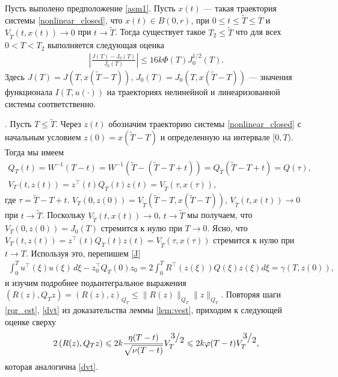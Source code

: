 \documentclass[../main.tex]{subfiles}
\begin{document}
\begin{theorem}\label{th:functional_error_estimate}
  Пусть выполено предположение \ref{asm1}. Пусть $x(t)$ --- такая траектория системы  \eqref{nonlinear_closed}, что $x(t)\in B(0,r)$, при $0\leqslant t  \leqslant \tilde{T} \leqslant \overline{T} $ и $V_{\tilde{T}}(t,x(t))\to 0$ при $t\to \tilde{T}$.  
  Тогда существует такое $T_2 \leqslant \tilde{T}$ что для всех  $0 < T < T_2 $ выполняется следующая оценка
   \begin{gather} \label{est}
	 \left| \frac{	J(T) - J_0(T)}{J_0(T)}\right| \leqslant 16k\Phi({T})J^{1/2}_0(T).
    \end{gather}
    Здесь $J(T)=J(T,x(\tilde{T}-T))$, $J_0(T)=J_0(T,x(\tilde{T}-T))$ --- значения функционала $I(T,u(\cdot))$ на траекториях нелинейной и линеаризованной системы соответственно.
\end{theorem}
\doc. 
Пусть $T\leqslant \tilde{T}$. Через $z(t)$ обозначим траекторию системы  \eqref{nonlinear_closed} с начальным условием $z(0)=x(\tilde{T}-T)$ и определенную на интервале $[0,T)$. 
Тогда мы имеем 
\begin{gather*}
Q_T(t)=W^{-1}(T-t)=W^{-1}(\tilde{T}-(\tilde{T}-T+t))=Q_{\tilde{T}}(\tilde{T}-T+t) = Q(\tau), \\ V_T(t,z(t))=z^\top(t)Q_T(t)z(t)=V_{\tilde{T}}(\tau,x(\tau)),
\end{gather*}
где $\tau=\tilde{T}-T+t$. 
$V_T(0,z(0))=V_{\tilde{T}}(\tilde{T}-T, x(\tilde{T}-T))$, $V_{\tilde{T}}(t,x(t))\to 0$ при $t\to \tilde{T}$. 
Поскольку  $V_{\tilde{T}}(t,x(t))\to 0$,  $t\to \tilde{T}$ мы получаем, что $V_T(0,z(0))=J_0(T)$  стремится к нулю при $T\to 0$.
Ясно, что  $V_T(t,z(t))=z^\top(t)Q_T(t)z(t)=V_{\tilde{T}}(\tau,x(\tau))$ стремится к нулю при $t\to T$.
Используя это, перепишем \eqref{J} 
\begin{gather}\label{J1}
	 \int_{0}^{T} u^{\top}(\xi)  u(\xi) \, d\xi - z_0^{\top} Q_T(0)z_0= 2\int_{0}^{T}  R^{\top}(z(\xi))Q(\xi) z(\xi) d\xi=\gamma(T,z(0)),
\end{gather}
и изучим подробнее подынтегральное выражения $\left( R(z), Q_T z\right)=(R(z),z)_{Q_T} \leqslant \| R(z) \|_{Q_T} \| z \|_{Q_T}$.
Повторяя шаги  \eqref{rqr_est}, \eqref{dvt} из доказательства леммы  \ref{lem:vest}, приходим к следующей оценке сверху
\begin{gather}\label{rqz}
    2 \left( R(z), Q_T z\right) \leqslant 2 k \frac{\eta(T-t)}{\sqrt{\nu(T-t)}}V_T^{\frc{3}{2}} \leqslant 2k \varphi(T-t) V_T^{\frc{3}{2}},
\end{gather}
которая аналогична \eqref{dvt}. 
\end{document}

